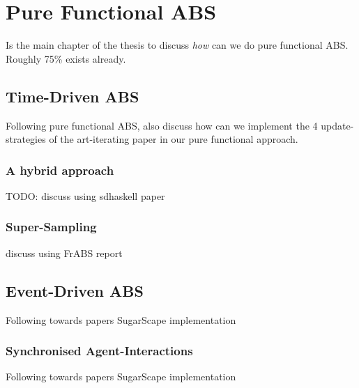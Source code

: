\chapter{Pure Functional ABS}
\label{ch:pfABS}

Is the main chapter of the thesis to discuss \textit{how} can we do pure functional ABS. Roughly 75\% exists already.

\section{Time-Driven ABS}
Following pure functional ABS, also discuss how can we implement the 4 update-strategies of the art-iterating paper in our pure functional approach.

\subsection{A hybrid approach}
TODO: discuss using sdhaskell paper

\subsection{Super-Sampling}
discuss using FrABS report

\section{Event-Driven ABS}
Following towards papers SugarScape implementation
\subsection{Synchronised Agent-Interactions}
Following towards papers SugarScape implementation


